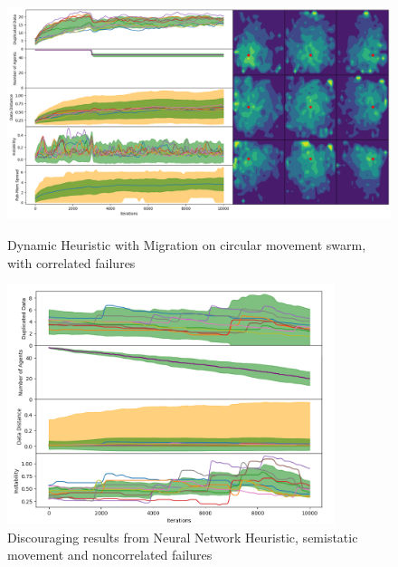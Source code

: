 \documentclass{UoYCSproject}
\begin{document}
\begin{figure}[htb]
\label{fig:circle_movement_con3}
\begin{center}
\centering
\includegraphics[height=7cm]{"./Dynamic_Migration/Circle_Move_con.png"}
\caption{Dynamic Heuristic with Migration on circular movement swarm, with correlated failures}
\end{center}
\end{figure}


\begin{figure}[htb]
\label{fig:Failed_GA}
\begin{center}
\centering
\includegraphics[height=7cm]{"./Failed_GA.png"}
\caption{Discouraging results from Neural Network Heuristic, semi\-static movement and non\-correlated failures}
\end{center}
\end{figure}

\end{document}
